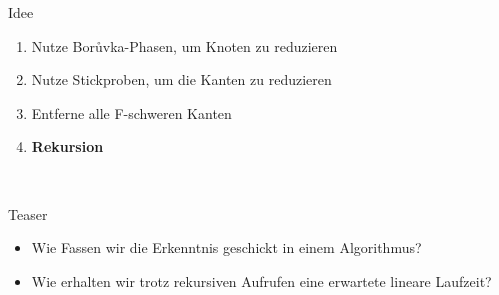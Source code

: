 \documentclass[10pt]{beamer}
\begin{document}
\begin{frame}{Idee}
    \begin{enumerate}
        \item Nutze Bor\r uvka-Phasen, um Knoten zu reduzieren
        \item Nutze Stickproben, um die Kanten zu reduzieren
        \item Entferne alle F-schweren Kanten
        \item \textbf{Rekursion}
    \end{enumerate}\\
\end{frame}
\begin{frame}{Teaser}
    \begin{itemize}
        \item Wie Fassen wir die Erkenntnis geschickt in einem Algorithmus?
        \item Wie erhalten wir trotz rekursiven Aufrufen eine erwartete lineare
              Laufzeit?
    \end{itemize}
\end{frame}
\end{document}
